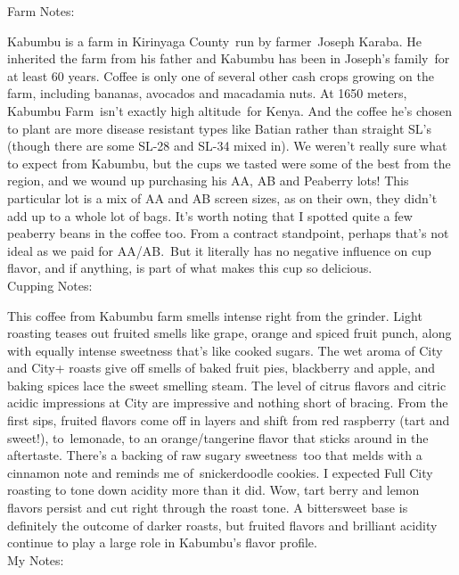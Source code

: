 \documentclass[10pt,twoside,footinclude=true,headinclude=true]{scrbook} %
\newlength{\mysize}
\newcommand{\myfontsize}[1]{
  \setlength{\mysize}{#1pt}
  \fontsize{\mysize}{1.2\mysize}
  \selectfont
}
\begin{document}

\newpage
\vspace*{-2.2em}
\raggedright
\normalsize
Farm Notes: \\
\myfontsize{8}
Kabumbu is a farm in Kirinyaga County run by farmer Joseph Karaba. He inherited the farm from his father and Kabumbu has been in Joseph's family for at least 60 years. Coffee is only one of several other cash crops growing on the farm, including bananas, avocados and macadamia nuts. At 1650 meters, Kabumbu Farm isn't exactly high altitude for Kenya. And the coffee he's chosen to plant are more disease resistant types like Batian rather than straight SL's (though there are some SL-28 and SL-34 mixed in). We weren't really sure what to expect from Kabumbu, but the cups we tasted were some of the best from the region, and we wound up purchasing his AA, AB and Peaberry lots! This particular lot is a mix of AA and AB screen sizes, as on their own, they didn't add up to a whole lot of bags. It's worth noting that I spotted quite a few peaberry beans in the coffee too. From a contract standpoint, perhaps that's not ideal as we paid for AA/AB. But it literally has no negative influence on cup flavor, and if anything, is part of what makes this cup so delicious. \\
\medskip
\normalsize
Cupping Notes: \\
\myfontsize{8}
This coffee from Kabumbu farm smells intense right from the grinder. Light roasting teases out fruited smells like grape, orange and spiced fruit punch, along with equally intense sweetness that's like cooked sugars. The wet aroma of City and City+ roasts give off smells of baked fruit pies, blackberry and apple, and baking spices lace the sweet smelling steam. The level of citrus flavors and citric acidic impressions at City are impressive and nothing short of bracing. From the first sips, fruited flavors come off in layers and shift from red raspberry (tart and sweet!), to lemonade, to an orange/tangerine flavor that sticks around in the aftertaste. There's a backing of raw sugary sweetness too that melds with a cinnamon note and reminds me of snickerdoodle cookies. I expected Full City roasting to tone down acidity more than it did. Wow, tart berry and lemon flavors persist and cut right through the roast tone. A bittersweet base is definitely the outcome of darker roasts, but fruited flavors and brilliant acidity continue to play a large role in Kabumbu's flavor profile.  \\
\medskip
\normalsize
My Notes:
\end{document}
